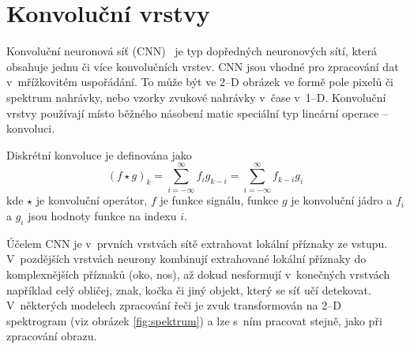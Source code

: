 \section{Konvoluční vrstvy}
Konvoluční neuronová síť (CNN)~\cite{6795724} je typ dopředných neuronových sítí, která obsahuje jednu či více konvolučních vrstev. CNN jsou vhodné pro zpracování dat v~mřížkovitém uspořádání. To může být ve 2--D obrázek ve formě pole pixelů či spektrum nahrávky, nebo vzorky zvukové nahrávky v~čase v~1--D. Konvoluční vrstvy používají místo běžného násobení matic speciální typ lineární operace -- konvoluci.

Diskrétní konvoluce je definována jako
\begin{equation}
   (f \star g)_k = \sum_{i=-\infty}^{\infty} f_i g_{k-i} = \sum_{i=-\infty}^{\infty} f_{k-i} g_{i}
\end{equation}
kde $\star$ je konvoluční operátor, $f$ je funkce signálu, funkce $g$ je konvoluční jádro a $f_i$ a $g_i$ jsou hodnoty funkce na indexu $i$.


Účelem CNN je v~prvních vrstvách sítě extrahovat lokální příznaky ze vstupu. V~pozdějších vrstvách neurony kombinují extrahované lokální příznaky do komplexnějších příznaků (oko, nos), až dokud nesformují v~konečných vrstvách například celý obličej, znak, kočka či jiný objekt, který se síť učí detekovat. V~některých modelech zpracování řeči je zvuk transformován na 2--D spektrogram (viz obrázek \ref{fig:spektrum}) a lze s~ním pracovat stejně, jako při zpracování obrazu.





